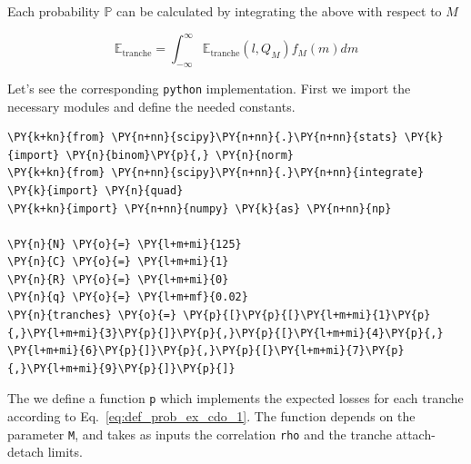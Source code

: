Each probability $\mathbb{P}$ can be calculated by integrating the above with respect to $M$
	
\[ \mathbb{E}_{\mathrm{tranche}} = \int_{-\infty}^{\infty}{\mathbb{E}_{\mathrm{tranche}}(l, Q_M) f_M(m)dm}\]

Let's see the corresponding \texttt{python} implementation.
First we import the necessary modules and define the needed constants.

\begin{tcolorbox}[breakable, size=fbox, boxrule=1pt, pad at break*=1mm,colback=cellbackground, colframe=cellborder]
\begin{Verbatim}[commandchars=\\\{\}]
\PY{k+kn}{from} \PY{n+nn}{scipy}\PY{n+nn}{.}\PY{n+nn}{stats} \PY{k}{import} \PY{n}{binom}\PY{p}{,} \PY{n}{norm}
\PY{k+kn}{from} \PY{n+nn}{scipy}\PY{n+nn}{.}\PY{n+nn}{integrate} \PY{k}{import} \PY{n}{quad}
\PY{k+kn}{import} \PY{n+nn}{numpy} \PY{k}{as} \PY{n+nn}{np}
	
\PY{n}{N} \PY{o}{=} \PY{l+m+mi}{125}
\PY{n}{C} \PY{o}{=} \PY{l+m+mi}{1}
\PY{n}{R} \PY{o}{=} \PY{l+m+mi}{0}
\PY{n}{q} \PY{o}{=} \PY{l+m+mf}{0.02}
\PY{n}{tranches} \PY{o}{=} \PY{p}{[}\PY{p}{[}\PY{l+m+mi}{1}\PY{p}{,}\PY{l+m+mi}{3}\PY{p}{]}\PY{p}{,}\PY{p}{[}\PY{l+m+mi}{4}\PY{p}{,} \PY{l+m+mi}{6}\PY{p}{]}\PY{p}{,}\PY{p}{[}\PY{l+m+mi}{7}\PY{p}{,}\PY{l+m+mi}{9}\PY{p}{]}\PY{p}{]}
\end{Verbatim}
\end{tcolorbox}

The we define a function \texttt{p} which implements the expected losses for each tranche according to Eq.~\ref{eq:def_prob_ex_cdo_1}.
The function depends on the parameter \texttt{M}, and takes as inputs the correlation \texttt{rho} and the tranche attach-detach limits.
	
